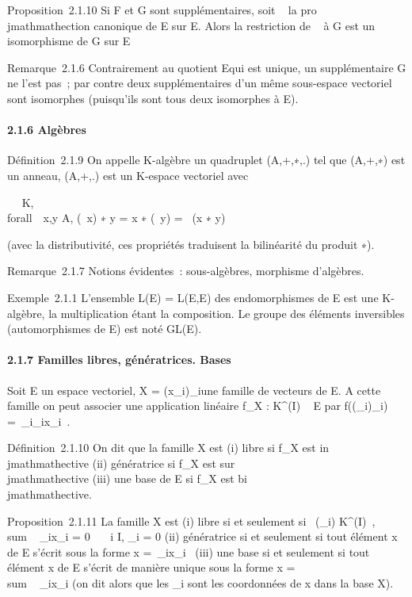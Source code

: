 \documentclass[]{article}
\begin{document}
Proposition~2.1.10 Si F et G sont supplémentaires, soit \pi~ la pro\\jmathmathection
canonique de E sur E\diagupF. Alors la restriction de \pi~ à G est un
isomorphisme de G sur E\diagupF

Remarque~2.1.6 Contrairement au quotient E\diagupF qui est unique, un
supplémentaire G ne l'est pas~; par contre deux supplémentaires d'un
même sous-espace vectoriel sont isomorphes (puisqu'ils sont tous deux
isomorphes à E\diagupF).

\paragraph{2.1.6 Algèbres}

Définition~2.1.9 On appelle K-algèbre un quadruplet (A,+,∗,.) tel que
(A,+,∗) est un anneau, (A,+,.) est un K-espace vectoriel avec

\forall~\lambda~ \in K, \\forall~~x,y \in A,
(\lambda~x) ∗ y = x ∗ (\lambda~y) = \lambda~(x ∗ y)

(avec la distributivité, ces propriétés traduisent la bilinéarité du
produit ∗).

Remarque~2.1.7 Notions évidentes~: sous-algèbres, morphisme d'algèbres.

Exemple~2.1.1 L'ensemble L(E) = L(E,E) des endomorphismes de E est une
K-algèbre, la multiplication étant la composition. Le groupe des
éléments inversibles (automorphismes de E) est noté GL(E).

\paragraph{2.1.7 Familles libres, génératrices. Bases}

Soit E un espace vectoriel, X = (x_i)_i\inI une famille
de vecteurs de E. A cette famille on peut associer une application
linéaire f_X : K^(I) \rightarrow~ E par
f((\alpha_i)_i\inI) =\
\sum  _i\inI\alpha_ix_i~.

Définition~2.1.10 On dit que la famille X est (i) libre si f_X
est in\\jmathmathective (ii) génératrice si f_X est sur\\jmathmathective (iii) une
base de E si f_X est bi\\jmathmathective.

Proposition~2.1.11 La famille X est (i) libre si et seulement si
\forall~(\alpha_i) \in K^(I)~,
\\sum ~
\alpha_ix_i = 0 \rigtharrow~\forall~~i \in I,
\alpha_i = 0 (ii) génératrice si et seulement si tout élément x de E
s'écrit sous la forme x =\
\sum  \alpha_ix_i~ (iii) une base
si et seulement si tout élément x de E s'écrit de manière unique sous la
forme x = \\sum ~
\alpha_ix_i (on dit alors que les \alpha_i sont les
coordonnées de x dans la base X).
\end{document}
